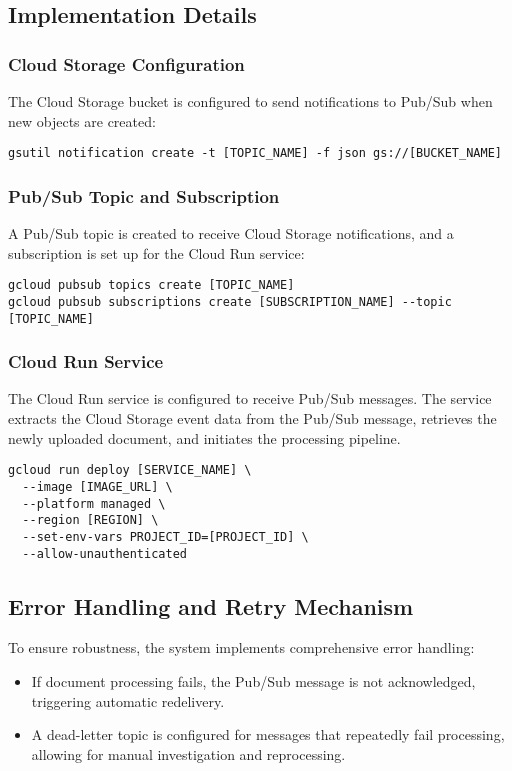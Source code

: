 \documentclass[a4paper, 12pt]{report}
\begin{document}
\subsection{Implementation Details}

\subsubsection{Cloud Storage Configuration}
The Cloud Storage bucket is configured to send notifications to Pub/Sub when new objects are created:

\begin{verbatim}
gsutil notification create -t [TOPIC_NAME] -f json gs://[BUCKET_NAME]
\end{verbatim}

\subsubsection{Pub/Sub Topic and Subscription}
A Pub/Sub topic is created to receive Cloud Storage notifications, and a subscription is set up for the Cloud Run service:

\begin{verbatim}
gcloud pubsub topics create [TOPIC_NAME]
gcloud pubsub subscriptions create [SUBSCRIPTION_NAME] --topic [TOPIC_NAME]
\end{verbatim}

\subsubsection{Cloud Run Service}
The Cloud Run service is configured to receive Pub/Sub messages. The service extracts the Cloud Storage event data from the Pub/Sub message, retrieves the newly uploaded document, and initiates the processing pipeline.

\begin{verbatim}
gcloud run deploy [SERVICE_NAME] \
  --image [IMAGE_URL] \
  --platform managed \
  --region [REGION] \
  --set-env-vars PROJECT_ID=[PROJECT_ID] \
  --allow-unauthenticated
\end{verbatim}

\subsection{Error Handling and Retry Mechanism}
To ensure robustness, the system implements comprehensive error handling:

\begin{itemize}
    \item If document processing fails, the Pub/Sub message is not acknowledged, triggering automatic redelivery.
    \item A dead-letter topic is configured for messages that repeatedly fail processing, allowing for manual investigation and reprocessing.
\end{itemize}
\end{document}
